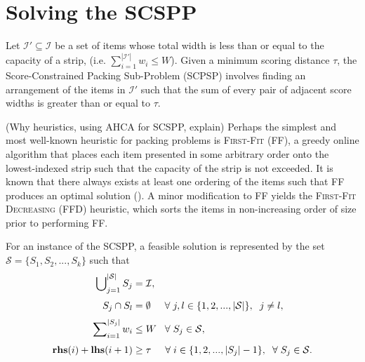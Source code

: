 \documentclass[oribibl]{llncs}
\begin{document}
\section{Solving the SCSPP}
\label{sec:scsppsoln}

\begin{definition}
	Let $\mathcal{I}' \subseteq \mathcal{I}$ be a set of items whose total width is less than or equal to the capacity of a strip, (i.e. $\sum_{i=1}^{|\mathcal{I}'|}w_i \leq W$). Given a minimum scoring distance $\tau$, the Score-Constrained Packing Sub-Problem (SCPSP) involves finding an arrangement of the items in $\mathcal{I}'$ such that the sum of every pair of adjacent score widths is greater than or equal to $\tau$.
\end{definition}

(Why heuristics, using AHCA for SCSPP, explain) Perhaps the simplest and most well-known heuristic for packing problems is \textsc{First-Fit} (FF), a greedy online algorithm that places each item presented in some arbitrary order onto the lowest-indexed strip such that the capacity of the strip is not exceeded. It is known that there always exists at least one ordering of the items such that FF produces an optimal solution (\citealp{lewis2009}). A minor modification to FF yields the \textsc{First-Fit Decreasing} (FFD) heuristic, which sorts the items in non-increasing order of size prior to performing FF.

For an instance of the SCSPP, a feasible solution is represented by the set $\mathcal{S} = \{S_1, S_2, ..., S_k\}$ such that
\begin{subequations}
	\begin{align}
		\bigcup\nolimits_{j=1}^{|\mathcal{S}|} S_j &= \mathcal{I}, \label{eqn:packall}\\[3pt]
		S_j \cap S_l &= \emptyset \hspace{5mm} \forall \hspace{1mm} j, l \in \{1, 2, ..., |\mathcal{S}|\}, \hspace{2mm} j \neq l, \label{eqn:nooverlap} \\[3pt]
		\sum\nolimits_{i=1}^{|S_j|}w_i & \leq W \hspace{3mm} \forall \hspace{1mm} S_j \in \mathcal{S}, \label{eqn:capacity} \\[3pt]
		\textup{\textbf{rhs}}(i) + \textup{\textbf{lhs}}(i+1) &\geq \tau \hspace {5mm} \forall \hspace{1mm} i \in \{1, 2, ..., |S_j|-1\}, \hspace{2mm} \forall \hspace{1mm} S_j \in \mathcal{S}. \label{eqn:vscstrip}
\end{align}
\end{subequations}
\end{document}
